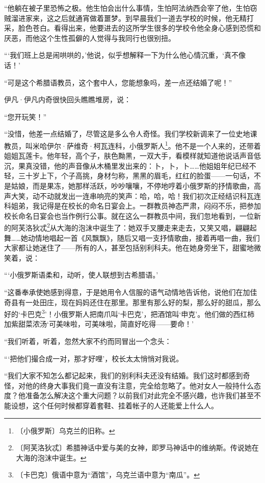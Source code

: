 \documentclass[12pt,UTF-8,openany]{ctexbook}
\begin{document}
\begin{normalsize}
    “他躺在被子里恐怖之极。他生怕会出什么事情，生怕阿法纳西会宰了他，生怕窃贼溜进家来，这之后就通宵做着噩梦。到早晨我们一道去学校的时候，他无精打采，脸色苍白。看得出来，他要进去的这所学生很多的学校令他全身心感到恐慌和厌恶，而他这个生性孤僻的人觉得与我同行也很别扭。
    
    “‘我们班上总是闹哄哄的，’他说，似乎想解释一下为什么他心情沉重，‘真不像话！’
    
    “可是这个希腊语教员，这个套中人，您能想象吗，差一点还结婚了呢！”
    
    伊凡·伊凡内奇很快回头瞧瞧堆房，说：
    
    “您开玩笑！”
    
    “没惜，他差一点结婚了，尽管这是多么令人奇怪。我们学校新调来了一位史地课教员，叫米哈伊尔·萨维奇·柯瓦连科，小俄罗斯人\footnote{〔小俄罗斯〕乌克兰的旧称。}。他不是一个人来的，还带着姐姐瓦莲卡。他年轻，高个子，肤色黝黑，一双大手，看模样就知道他说话声音低沉，果真没错，他的声音像从木桶里发出来的：卜，卜，卜……他姐姐年纪已经不轻，三十岁上下，个子高挑，身材匀称，黑黑的眉毛，红红的脸蛋——一句话，不是姑娘，而是果冻，她那样活跃，吵吵嚷嚷，不停地哼着小俄罗斯的抒情歌曲，高声大笑，动不动就发出一连串响亮的笑声：哈，哈，哈！我们初次正经结识科瓦连科姐弟，我记得是在校长的命名日宴会上。一群教员神态严肃，闷闷不乐，把参加校长命名日宴会也当作例行公事。就在这么一群教员中间，我们忽地看到，一位新的阿芙洛狄忒\footnote{〔阿芙洛狄忒〕希腊神话中爱与美的女神，即罗马神话中的维纳斯。传说她在大海的泡沫中诞生。}从大海的泡沫中诞生了：她双手叉腰走来走去，又笑又唱，翩翩起舞……她动情地唱起一首《风飘飘》，随后又唱一支抒情歌曲，接着再唱一曲，我们大家都让她迷住了——所有的人，甚至包括别利科夫。他在她身旁坐下，甜蜜地微笑着，说：
    
    “‘小俄罗斯语柔和，动听，使人联想到古希腊语。’
    
    “这番奉承使她感到得意，于是她用令人信服的语气动情地告诉他，说他们在加佳奇县有一处田庄，现在妈妈还住在那里。那里有那么好的梨，那么好的甜瓜，那么好的‘卡巴克\footnote{〔卡巴克〕俄语中意为“酒馆”，乌克兰语中意为“南瓜”。}’！小俄罗斯人把南爪叫‘卡巴克’，把酒馆叫‘申克’。他们做的西红柿加紫甜菜浓汤‘可美味啦，可美味啦，简直好吃得——要命！’
    
    “我们听着，听着，忽然大家不约而同冒出一个念头：
    
    “‘把他们撮合成一对，那才好哩’，校长太太悄悄对我说。
    
    “我们大家不知怎么都记起来，我们的别利科夫还没有结婚。我们这时都感到奇怪，对他的终身大事我们竟一直没有注意，完全给忽略了。他对女人一般持什么态度？他准备怎么解决这个重大问题？以前我们对此完全不感兴趣，也许我们甚至不能设想，这个任何时候都穿着套鞋、挂着帐子的人还能爱上什么人。
    

\end{normalsize}
\end{document}
